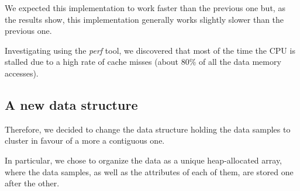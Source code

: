 \documentclass{article}
\begin{document}
We expected this implementation to work faster than the previous one but, as the results show,
this implementation generally works slightly slower than the previous one.

Investigating using the \textit{perf} tool, we discovered that most of the time the CPU is
stalled due to a high rate of cache misses (about 80\% of all the data memory accesses).

\hypertarget{a-new-data-structure}{%
\subsection{A new data structure}\label{a-new-data-structure}}

Therefore, we decided to change the data structure holding the data samples to cluster in favour
of a more a contiguous one.

In particular, we chose to organize the data as a unique heap-allocated array, where the data
samples, as well as the attributes of each of them, are stored one after the other.

\end{document}
